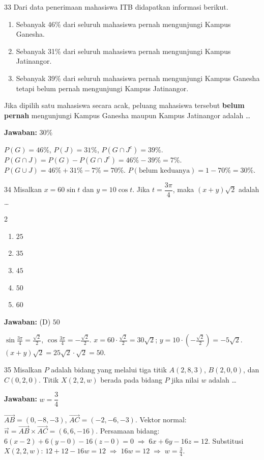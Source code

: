 \documentclass[11pt]{article}
\newcommand{\jawaban}[1]{%
  \noindent\colorbox{gold!30}{\parbox{\dimexpr\linewidth-2\fboxsep\relax}{%
    \textbf{Jawaban:} #1}}\par\smallskip}
\newenvironment{pilB}{%
  \par\smallskip\begin{multicols}{2}
  \begin{enumerate}[label=(\Alph*),leftmargin=*,itemsep=1pt,topsep=3pt]}%
  {\end{enumerate}\end{multicols}}
\begin{document}
\begin{soal}{33}
Dari data penerimaan mahasiswa ITB didapatkan informasi berikut.
\begin{enumerate}[leftmargin=*,itemsep=2pt,topsep=3pt]
  \item Sebanyak 46\% dari seluruh mahasiswa pernah mengunjungi
        Kampus Ganesha.
  \item Sebanyak 31\% dari seluruh mahasiswa pernah mengunjungi
        Kampus Jatinangor.
  \item Sebanyak 39\% dari seluruh mahasiswa pernah mengunjungi
        Kampus Ganesha tetapi belum pernah mengunjungi Kampus
        Jatinangor.
\end{enumerate}
Jika dipilih satu mahasiswa secara acak, peluang mahasiswa tersebut
\textbf{belum pernah} mengunjungi Kampus Ganesha maupun Kampus
Jatinangor adalah \ldots
\end{soal}
\begin{pembox}
\jawaban{$30\%$}
$P(G)=46\%$, $P(J)=31\%$, $P(G\cap J^c)=39\%$.
$P(G\cap J)=P(G)-P(G\cap J^c)=46\%-39\%=7\%$.
$P(G\cup J)=46\%+31\%-7\%=70\%$.
$P(\text{belum keduanya})=1-70\%=30\%$.
\end{pembox}

\begin{soal}{34}
Misalkan $x=60\sin t$ dan $y=10\cos t$. Jika $t=\dfrac{3\pi}{4}$,
maka $(x+y)\sqrt{2}$ adalah \ldots
\begin{pilB}
  \item $25$ \item $35$ \item $45$ \item $50$ \item $60$
\end{pilB}
\end{soal}
\begin{pembox}
\jawaban{(D) $50$}
$\sin\tfrac{3\pi}{4}=\tfrac{\sqrt{2}}{2}$, $\cos\tfrac{3\pi}{4}=-\tfrac{\sqrt{2}}{2}$.
$x=60\cdot\tfrac{\sqrt{2}}{2}=30\sqrt{2}$;\; $y=10\cdot(-\tfrac{\sqrt{2}}{2})=-5\sqrt{2}$.
$(x+y)\sqrt{2}=25\sqrt{2}\cdot\sqrt{2}=50$.
\end{pembox}

\begin{soal}{35}
Misalkan $P$ adalah bidang yang melalui tiga titik $A(2,8,3)$,
$B(2,0,0)$, dan $C(0,2,0)$. Titik $X(2,2,w)$ berada pada bidang
$P$ jika nilai $w$ adalah \ldots
\end{soal}
\begin{pembox}
\jawaban{$w=\dfrac{3}{4}$}
$\vec{AB}=(0,-8,-3)$, $\vec{AC}=(-2,-6,-3)$. Vektor normal: $\vec{n}=\vec{AB}\times\vec{AC}=(6,6,-16)$.
Persamaan bidang: $6(x-2)+6(y-0)-16(z-0)=0\;\Rightarrow\;6x+6y-16z=12$.
Substitusi $X(2,2,w)$: $12+12-16w=12\;\Rightarrow\;16w=12\;\Rightarrow\;w=\tfrac{3}{4}$.
\end{pembox}
\end{document}
